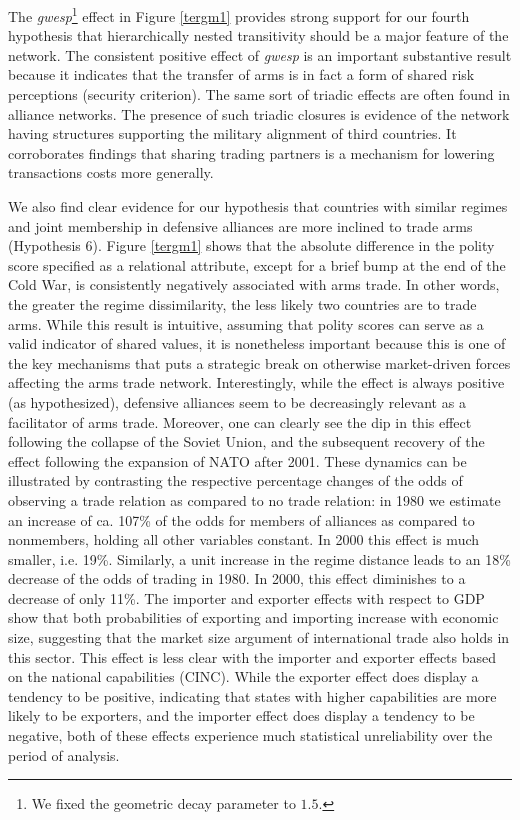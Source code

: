 \documentclass[12pt, letterpaper]{article}
\numberwithin{equation}{section}
\begin{document}
The \textit{gwesp}\footnote{We fixed the geometric decay parameter to $1.5$.} effect in Figure \ref{tergm1} provides strong support for our fourth hypothesis that hierarchically nested transitivity should be a major feature of the network. 
The consistent positive effect of \textit{gwesp} is an important substantive result because it indicates that the transfer of arms is in fact a form of shared risk perceptions (security criterion). The same sort of triadic effects are often found in alliance networks. The presence of such triadic closures is evidence of the network having structures supporting the military alignment of third countries. It corroborates findings \citep{Chaney:2016} that sharing trading partners is a mechanism for lowering transactions costs more generally. 

We also find clear evidence for our hypothesis that countries with similar regimes and joint membership in defensive alliances are more inclined to trade arms (Hypothesis 6). 
Figure \ref{tergm1} shows that the absolute difference in the polity score specified as a relational attribute, except for a brief bump at the end of the Cold War, is consistently negatively associated with arms trade. 
In other words, the greater the regime dissimilarity, the less likely two countries are to trade arms. 
While this result is intuitive, assuming that polity scores can serve as a valid indicator of shared values, it is nonetheless important because this is one of the key mechanisms that puts a strategic break on otherwise market-driven forces affecting the arms trade network. 
Interestingly, while the effect is always positive (as hypothesized), defensive alliances seem to be decreasingly relevant as a facilitator of arms trade. Moreover, one can clearly see the dip in this effect following the collapse of the Soviet Union, and the subsequent recovery of the effect following the expansion of NATO after 2001. 
These dynamics can be illustrated by contrasting the respective percentage changes of the odds of observing a trade relation as compared to no trade relation: in 1980 we estimate an increase of ca. 107\% of the odds for members of alliances as compared to nonmembers, holding all other variables constant. In 2000 this effect is much smaller, i.e. 19\%. Similarly, a unit increase in the regime distance leads to an 18\% decrease of the odds of trading in 1980. In 2000, this effect diminishes to a decrease of only 11\%. The importer and exporter effects with respect to GDP show that both probabilities of exporting and importing increase with economic size, suggesting that the market size argument of international trade also holds in this sector. 
This effect is less clear with the importer and exporter effects based on the national capabilities (CINC). While the exporter effect does display a tendency to be positive, indicating that states with higher capabilities are more likely to be exporters, and the importer effect does display a tendency to be negative, both of these effects experience much statistical unreliability over the period of analysis.
\end{document}
